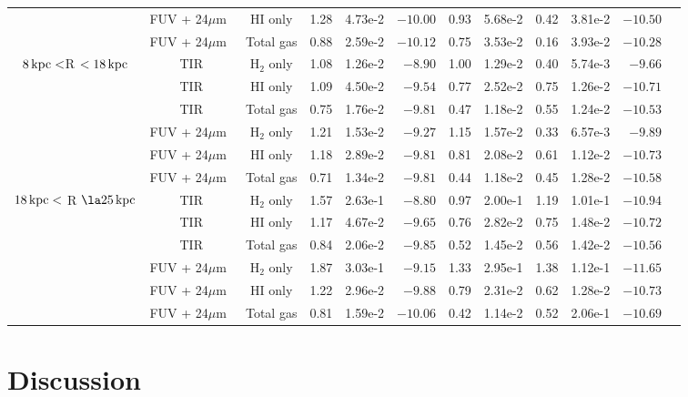 \documentclass[useAMS,usenatbib]{mn2e}
\newcommand \kpc        {\,{\rm kpc}}
\newcommand \um    {$\mu$m\ }
\begin{document}
\begin{table*}
\begin{tabular}{cccccrccccrr}
 & FUV + 24\um & HI only    & 1.28 & 4.73e-2  & $-10.00$ & 0.93 & 5.68e-2  & 0.42 & 3.81e-2  & $-10.50$ \\
 & FUV + 24\um & Total gas  & 0.88 & 2.59e-2  & $-10.12$ & 0.75 & 3.53e-2  & 0.16 & 3.93e-2  & $-10.28$ \\
\hline
\multicolumn{1}{c}{\multirow{6}{*}{$8\kpc < $R $< 18\kpc$}} & TIR & H$_2$ only & 1.08 & 1.26e-2 & $-8.90$  & 1.00 & 1.29e-2 & 0.40 & 5.74e-3 & $-9.66$  \\
 & TIR         & HI only    & 1.09 & 4.50e-2 & $-9.54$  & 0.77 & 2.52e-2  & 0.75 & 1.26e-2  & $-10.71$ \\
 & TIR         & Total gas  & 0.75 & 1.76e-2  & $-9.81$  & 0.47 & 1.18e-2  & 0.55 & 1.24e-2  & $-10.53$ \\
 & FUV + 24\um & H$_2$ only & 1.21 & 1.53e-2 & $-9.27$  & 1.15 & 1.57e-2 & 0.33 & 6.57e-3 & $-9.89$  \\
 & FUV + 24\um & HI only    & 1.18 & 2.89e-2 & $-9.81$  & 0.81 & 2.08e-2 & 0.61 & 1.12e-2 & $-10.73$ \\
 & FUV + 24\um & Total gas  & 0.71 & 1.34e-2 & $-9.81$  & 0.44 & 1.18e-2  & 0.45 & 1.28e-2  & $-10.58$ \\
\hline
\multicolumn{1}{c}{\multirow{6}{*}{$18\kpc <$ R $\la 25\kpc$}}  & TIR & H$_2$ only & 1.57 & 2.63e-1  & $-8.80$  & 0.97 & 2.00e-1  & 1.19 & 1.01e-1  & $-10.94$ \\
 & TIR         & HI only    & 1.17 & 4.67e-2 & $-9.65$  & 0.76 & 2.82e-2 & 0.75 & 1.48e-2 & $-10.72$ \\
 & TIR         & Total gas  & 0.84 & 2.06e-2  & $-9.85$  & 0.52 & 1.45e-2  & 0.56 & 1.42e-2  & $-10.56$ \\
 & FUV + 24\um & H$_2$ only & 1.87 & 3.03e-1  & $-9.15$  & 1.33 & 2.95e-1  & 1.38 & 1.12e-1  & $-11.65$ \\
 & FUV + 24\um & HI only    & 1.22 & 2.96e-2 & $-9.88$  & 0.79 & 2.31e-2 & 0.62 & 1.28e-2 & $-10.73$ \\
 & FUV + 24\um & Total gas  & 0.81 & 1.59e-2 & $-10.06$ & 0.42 & 1.14e-2  & 0.52 & 2.06e-1  & $-10.69$\\
 \hline
\end{tabular}
\end{table*}
%
\section{Discussion}
\end{document}
